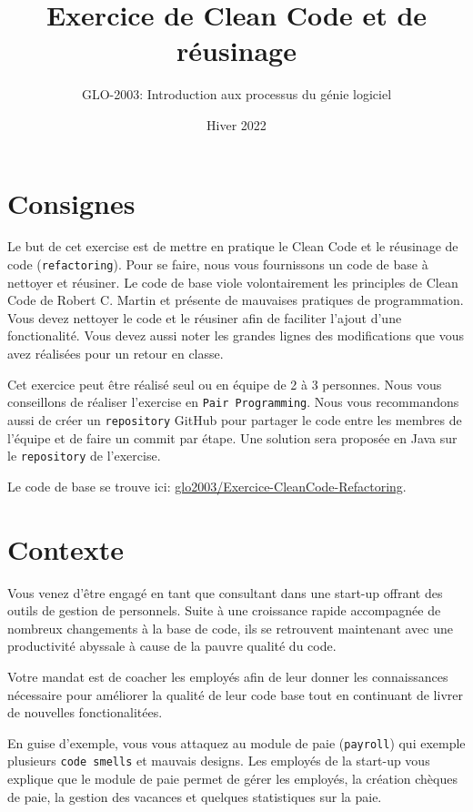 \documentclass[french]{article}
\title{Exercice de Clean Code et de réusinage}
\author{GLO-2003: Introduction aux processus du génie logiciel}
\date{Hiver 2022}
\begin{document}
\maketitle

\section{Consignes}
Le but de cet exercise est de mettre en pratique le Clean Code et le réusinage de code (\texttt{refactoring}). Pour se faire, nous vous fournissons un code de base à nettoyer et réusiner. Le code de base viole volontairement les principles de Clean Code de Robert C. Martin\cite{martinClean} et présente de mauvaises pratiques de programmation. Vous devez nettoyer le code et le réusiner afin de faciliter l'ajout d'une fonctionalité. Vous devez aussi noter les grandes lignes des modifications que vous avez réalisées pour un retour en classe.

Cet exercice peut être réalisé seul ou en équipe de 2 à 3 personnes. Nous vous conseillons de réaliser l'exercise en \texttt{Pair Programming}. Nous vous recommandons aussi de créer un \texttt{repository} GitHub pour partager le code entre les membres de l'équipe et de faire un commit par étape. Une solution sera proposée en Java sur le \texttt{repository} de l'exercise.

Le code de base se trouve ici: \href{https://github.com/glo2003/Exercice-CleanCode-Refactoring}{glo2003/Exercice-CleanCode-Refactoring}.

\section{Contexte}
Vous venez d'être engagé en tant que consultant dans une start-up offrant des outils de gestion de personnels. Suite à une croissance rapide accompagnée de nombreux changements à la base de code, ils se retrouvent maintenant avec une productivité abyssale à cause de la pauvre qualité du code.

Votre mandat est de coacher les employés afin de leur donner les connaissances nécessaire pour améliorer la qualité de leur code base tout en continuant de livrer de nouvelles fonctionalitées.

En guise d'exemple, vous vous attaquez au module de paie (\texttt{payroll}) qui exemple plusieurs \texttt{code smells} et mauvais designs. Les employés de la start-up vous explique que le module de paie permet de gérer les employés, la création chèques de paie, la gestion des vacances et quelques statistiques sur la paie.
\end{document}
